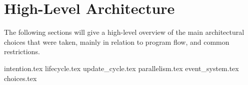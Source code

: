 \section{High-Level Architecture}
The following sections will give a high-level overview of the main architectural
choices that were taken, mainly in relation to program flow, and common restrictions.

{intention.tex}
{lifecycle.tex}
{update_cycle.tex}
{parallelism.tex}
{event_system.tex}
{choices.tex}
